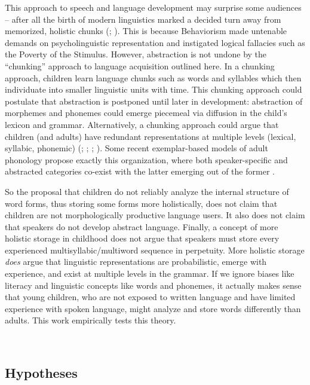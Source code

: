 \documentclass[a4paper,man,floatsintext,natbib,donotrepeattitle, apacite]{apa6}
\begin{document}
This approach to speech and language development may surprise some audiences – after all the birth of modern linguistics marked a decided turn away from memorized, holistic chunks (\citealt{chomskyReviewBFSkinner1959}; \citealt{skinnerVerbalBehavior1957}). This is because Behaviorism made untenable demands on psycholinguistic representation and instigated logical fallacies such as the Poverty of the Stimulus. However, abstraction is not undone by the “chunking” approach to language acquisition outlined here. In a chunking approach, children learn language chunks such as words and syllables which then individuate into smaller linguistic units with time. This chunking approach could postulate that abstraction is postponed until later in development: abstraction of morphemes and phonemes could emerge piecemeal via diffusion in the child's lexicon and grammar. Alternatively, a chunking approach could argue that children (and adults) have redundant representations at multiple levels (lexical, syllabic, phonemic) (\citealt{arnonRoleMultiwordBuilding2017}; \citealt{arnonMoreWordsEffect2013}; \citealt{arnonStartingBigRole2010}; \citealt{bannardStoredWordSequences2008}). Some recent exemplar-based models of adult phonology propose exactly this organization, where both speaker-specific and abstracted categories co-exist with the latter emerging out of the former \citep{pierrehumbertPhonologicalRepresentationAbstract}. 

So the proposal that children do not reliably analyze the internal structure of word forms, thus storing some forms more holistically, does not claim that children are not morphologically productive language users. It also does not claim that speakers do not develop abstract language. Finally, a concept of more holistic storage in childhood does not argue that speakers must store every experienced multisyllabic/multiword sequence in perpetuity. More holistic storage \textit{does} argue that linguistic representations are probabilistic, emerge with experience, and exist at multiple levels in the grammar. If we ignore biases like literacy and linguistic concepts like words and phonemes, it actually makes sense that young children, who are not exposed to written language and have limited experience with spoken language, might analyze and store words differently than adults. This work empirically tests this theory.

~
~

\subsection{Hypotheses}
\end{document}
